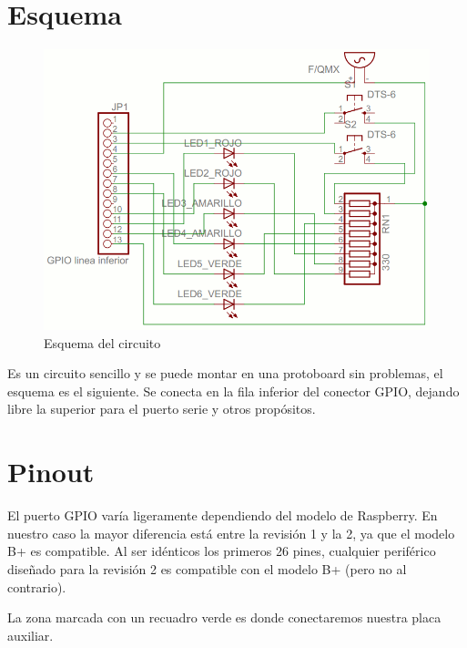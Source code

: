 \pagestyle{fancy}
\fancyhead[LE,RO]{\thepage}
\fancyhead[LO]{\nouppercase{\rightmark}}

\label{chp:PlacaAux}
\minitoc

\section{Esquema}

\begin{figure}[h]
  \centering
    \includegraphics[width=14cm]{graphs/circuito.png}
  \caption{Esquema del circuito}
  \label{fig:circuito}
\end{figure}

Es un circuito sencillo y se puede montar en una protoboard sin
problemas, el esquema es el siguiente. Se conecta en la fila
inferior del conector GPIO, dejando libre la superior para el puerto
serie y otros propósitos.

\section{Pinout}

El puerto GPIO varía ligeramente dependiendo del modelo de Raspberry. En nuestro caso
la mayor diferencia está entre la revisión 1 y la 2, ya que el modelo B+ es compatible.
Al ser idénticos los primeros 26 pines, cualquier periférico diseñado para la revisión 2
es compatible con el modelo B+ (pero no al contrario).

La zona marcada con un recuadro verde es donde conectaremos nuestra placa auxiliar.

